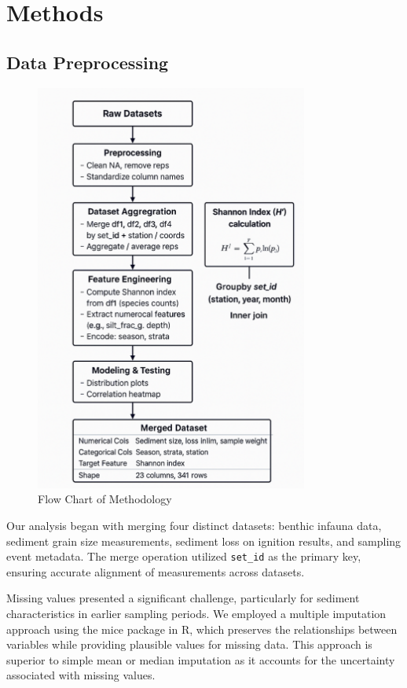 \documentclass[12pt]{article}
\begin{document}
\newpage
\section{Methods}

\subsection{Data Preprocessing}

\begin{figure}[h!]
\centering
\includegraphics[width=0.8\textwidth]{flowchart.png}
\caption{Flow Chart of Methodology}
\label{fig:flowchart}
\end{figure}


\qquad Our analysis began with merging four distinct datasets: benthic infauna
data, sediment grain size measurements, sediment loss on ignition results, and
sampling event metadata. The merge operation utilized \texttt{set\_id} as the
primary key, ensuring accurate alignment of measurements across datasets.

\qquad Missing values presented a significant challenge, particularly for
sediment characteristics in earlier sampling periods. We employed a multiple
imputation approach using the mice package in R, which preserves the
relationships between variables while providing plausible values for missing
data. This approach is superior to simple mean or median imputation as it
accounts for the uncertainty associated with missing values.
\end{document}

